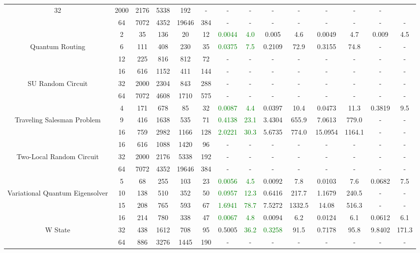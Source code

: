 \begin{table}[htb]
{\begin{tabular}{|c|c|c|c|c|c|c|c|c|c|c|c|c|c|}
32 & 2000 & 2176 & 5338 & 192
 & - & -
 & - & -
 & - & -
 & - & -
 \\
 & 
64 & 7072 & 4352 & 19646 & 384
 & - & -
 & - & -
 & - & -
 & - & -
 \\
\hline
 & 
2 & 35 & 136 & 20 & 12
 & \textcolor{green}{0.0044} & \textcolor{green}{4.0}
 & 0.005 & 4.6
 & 0.0049 & 4.7
 & 0.009 & 4.5
 \\
Quantum Routing & 
6 & 111 & 408 & 230 & 35
 & \textcolor{green}{0.0375} & \textcolor{green}{7.5}
 & 0.2109 & 72.9
 & 0.3155 & 74.8
 & - & -
 \\
 & 
12 & 225 & 816 & 812 & 72
 & - & -
 & - & -
 & - & -
 & - & -
 \\
\hline
 & 
16 & 616 & 1152 & 411 & 144
 & - & -
 & - & -
 & - & -
 & - & -
 \\
SU Random Circuit & 
32 & 2000 & 2304 & 843 & 288
 & - & -
 & - & -
 & - & -
 & - & -
 \\
 & 
64 & 7072 & 4608 & 1710 & 575
 & - & -
 & - & -
 & - & -
 & - & -
 \\
\hline
 & 
4 & 171 & 678 & 85 & 32
 & \textcolor{green}{0.0087} & \textcolor{green}{4.4}
 & 0.0397 & 10.4
 & 0.0473 & 11.3
 & 0.3819 & 9.5
 \\
Traveling Salesman Problem & 
9 & 416 & 1638 & 535 & 71
 & \textcolor{green}{0.4138} & \textcolor{green}{23.1}
 & 3.4304 & 655.9
 & 7.0613 & 779.0
 & - & -
 \\
 & 
16 & 759 & 2982 & 1166 & 128
 & \textcolor{green}{2.0221} & \textcolor{green}{30.3}
 & 5.6735 & 774.0
 & 15.0954 & 1164.1
 & - & -
 \\
\hline
 & 
16 & 616 & 1088 & 1420 & 96
 & - & -
 & - & -
 & - & -
 & - & -
 \\
Two-Local Random Circuit & 
32 & 2000 & 2176 & 5338 & 192
 & - & -
 & - & -
 & - & -
 & - & -
 \\
 & 
64 & 7072 & 4352 & 19646 & 384
 & - & -
 & - & -
 & - & -
 & - & -
 \\
\hline
 & 
5 & 68 & 255 & 103 & 23
 & \textcolor{green}{0.0056} & \textcolor{green}{4.5}
 & 0.0092 & 7.8
 & 0.0103 & 7.6
 & 0.0682 & 7.5
 \\
Variational Quantum Eigensolver & 
10 & 138 & 510 & 352 & 50
 & \textcolor{green}{0.0957} & \textcolor{green}{12.3}
 & 0.6416 & 217.7
 & 1.1679 & 240.5
 & - & -
 \\
 & 
15 & 208 & 765 & 593 & 67
 & \textcolor{green}{1.6941} & \textcolor{green}{78.7}
 & 7.5272 & 1332.5
 & 14.08 & 516.3
 & - & -
 \\
\hline
 & 
16 & 214 & 780 & 338 & 47
 & \textcolor{green}{0.0067} & \textcolor{green}{4.8}
 & 0.0094 & 6.2
 & 0.0124 & 6.1
 & 0.0612 & 6.1
 \\
W State & 
32 & 438 & 1612 & 708 & 95
 & 0.5005 & \textcolor{green}{36.2}
 & \textcolor{green}{0.3258} & 91.5
 & 0.7178 & 95.8
 & 9.8402 & 171.3
 \\
 & 
64 & 886 & 3276 & 1445 & 190
 & - & -
 & - & -
 & - & -
 & - & -
 \\
\hline
\end{tabular}}
\end{table}